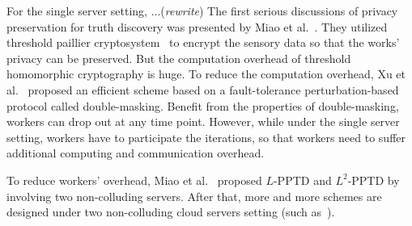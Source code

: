 \documentclass[conference]{IEEEtran}
\begin{document}
For the single server setting, ...({\em rewrite})
The first serious discussions of privacy preservation for truth discovery was presented by Miao et al.~\cite{miao_cloud-enabled_2015}.
They utilized threshold paillier cryptosystem~\cite{damgard_generalisation_2001} to encrypt the sensory data so that the works' privacy can be preserved.
But the computation overhead of threshold homomorphic cryptography is huge.
To reduce the computation overhead, Xu et al.~\cite{xu_efficient_2019} proposed an efficient scheme based on a fault-tolerance perturbation-based protocol called double-masking.
Benefit from the properties of double-masking, workers can drop out at any time point.
However, while under the single server setting, workers have to participate the iterations, so that workers need to suffer additional computing and communication overhead.

To reduce workers' overhead, Miao et al.~\cite{miao_lightweight_2017} proposed $L$-PPTD and $L^2$-PPTD by involving two non-colluding servers.
After that, more and more schemes are designed under two non-colluding cloud servers setting (such as~\cite{zhang_lptd_2019,zhang_reliable_2019,xue_inpptd_2020,tang_achieving_2021}).
\end{document}
